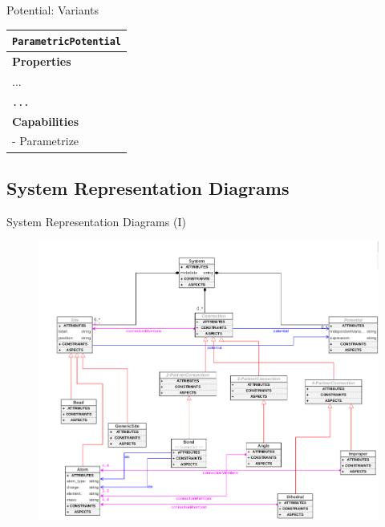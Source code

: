 \documentclass[xcolor=table]{beamer}
\begin{document}
\begin{frame}{Potential: Variants}

\begin{table}[ht]
    \centering
    \begin{tabular}{|l|}
         \hline
         \rowcolor{gray!50}
         \texttt{ParametricPotential}  \\
         \hline

         \textbf{Properties}\\
         \hline
            ...\\
         \texttt{...}\\
         \hline
         \textbf{Capabilities}\\
         \hline
         - Parametrize\\
        \hline
    \end{tabular}
    \label{tab:PotSpec}
\end{table}
\end{frame}

\subsection{System Representation Diagrams}
\begin{frame}[plain]{System Representation Diagrams (I)}

\begin{figure}[]
    \centering
    \includegraphics[scale=0.28]{docs/topo}
    \label{fig:TopoDiagram}
\end{figure}
\end{frame}
\end{document}
